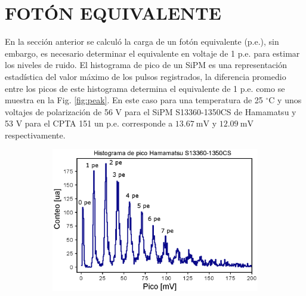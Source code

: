 \section{FOTÓN EQUIVALENTE}
En la sección anterior se calculó la carga de un fotón equivalente (p.e.), sin embargo, es necesario determinar el equivalente en voltaje de 1 p.e. para estimar los niveles de ruido. El histograma de pico de un SiPM es una representación estadística del valor máximo de los pulsos registrados, la diferencia promedio entre los picos de este histograma determina el equivalente de 1 p.e. como se muestra en la Fig. \ref{fig:peak}. En este caso para una temperatura de 25 $^\circ$C y unos voltajes de polarización de 56 V para el SiPM S13360-1350CS de Hamamatsu y 53 V para el  CPTA 151 un p.e. corresponde a $13.67~\mbox{mV}$ y $12.09~\mbox{mV}$ respectivamente.    
\begin{figure}[h!]
     \centering
        \caption{Forma característica del histograma de pico para los SiPM S13360-1350CS de Hamamatsu (izquierda) y CPTA 151 (derecha). La distancia entre los picos del histograma es constante y determina el equivalente en voltaje de 1 p.e., siendo $13.67~\mbox{mV}$ para el SiPM S13360-1350CS de Hamamatsu y $12.09~\mbox{mV}$ para el CPTA 151.}
     \begin{subfigure}[b]{0.49\textwidth}
         \centering
         \includegraphics[width=1.1\textwidth]{Images/Peak_1350CS.eps}
         \label{fig:peak_1350CS}
     \end{subfigure}
     \begin{subfigure}[b]{0.49\textwidth}
         \centering

\end{subfigure}
\end{figure}
